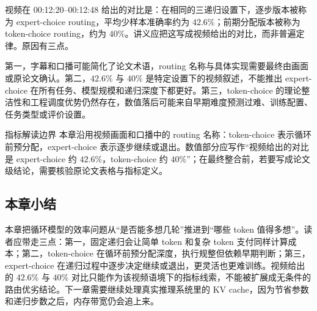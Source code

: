 视频在 00:12:20--00:12:48 给出的对比是：在相同的三递归设置下，逐步版本被称为 expert-choice routing，平均少样本准确率约为 \(42.6\%\)；前期分配版本被称为 token-choice routing，约为 \(40\%\)。讲义应把这写成视频给出的对比，而非普遍定律。原因有三点。

第一，字幕和口播可能简化了论文术语，routing 名称与具体实现需要最终由画面或原论文确认。第二，\(42.6\%\) 与 \(40\%\) 是特定设置下的视频叙述，不能推出 expert-choice 在所有任务、模型规模和递归深度下都更好。第三，token-choice 的理论整洁性和工程调度优势仍然存在，数值落后可能来自早期难度预测过难、训练配置、任务类型或评价设置。

\begin{warningbox}{指标解读边界}
本章沿用视频画面和口播中的 routing 名称：token-choice 表示循环前预分配，expert-choice 表示逐步继续或退出。数值部分应写作“视频给出的对比是 expert-choice 约 \(42.6\%\)，token-choice 约 \(40\%\)”；在最终整合前，若要写成论文级结论，需要核验原论文表格与指标定义。
\end{warningbox}

\subsection{本章小结}

本章把循环模型的效率问题从“是否能多想几轮”推进到“哪些 token 值得多想”。读者应带走三点：第一，固定递归会让简单 token 和复杂 token 支付同样计算成本；第二，token-choice 在循环前预分配深度，执行规整但依赖早期判断；第三，expert-choice 在递归过程中逐步决定继续或退出，更灵活也更难训练。视频给出的 \(42.6\%\) 与 \(40\%\) 对比只能作为该视频语境下的指标线索，不能被扩展成无条件的路由优劣结论。下一章需要继续处理真实推理系统里的 KV cache，因为节省参数和递归步数之后，内存带宽仍会追上来。
